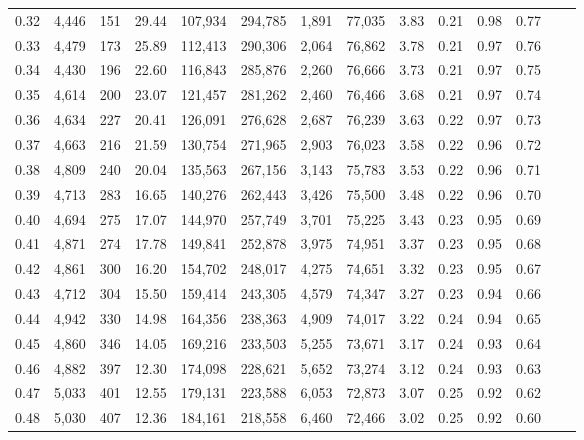 \begin{tabular}{rrrrrrrrrrrrrr}
0.32 &  4,446 &    151 &    29.44 &  107,934 &  294,785 &   1,891 &  77,035 &  3.83 &  0.21 &  0.98 &      0.77 \\
0.33 &  4,479 &    173 &    25.89 &  112,413 &  290,306 &   2,064 &  76,862 &  3.78 &  0.21 &  0.97 &      0.76 \\
0.34 &  4,430 &    196 &    22.60 &  116,843 &  285,876 &   2,260 &  76,666 &  3.73 &  0.21 &  0.97 &      0.75 \\
0.35 &  4,614 &    200 &    23.07 &  121,457 &  281,262 &   2,460 &  76,466 &  3.68 &  0.21 &  0.97 &      0.74 \\
0.36 &  4,634 &    227 &    20.41 &  126,091 &  276,628 &   2,687 &  76,239 &  3.63 &  0.22 &  0.97 &      0.73 \\
0.37 &  4,663 &    216 &    21.59 &  130,754 &  271,965 &   2,903 &  76,023 &  3.58 &  0.22 &  0.96 &      0.72 \\
0.38 &  4,809 &    240 &    20.04 &  135,563 &  267,156 &   3,143 &  75,783 &  3.53 &  0.22 &  0.96 &      0.71 \\
0.39 &  4,713 &    283 &    16.65 &  140,276 &  262,443 &   3,426 &  75,500 &  3.48 &  0.22 &  0.96 &      0.70 \\
0.40 &  4,694 &    275 &    17.07 &  144,970 &  257,749 &   3,701 &  75,225 &  3.43 &  0.23 &  0.95 &      0.69 \\
0.41 &  4,871 &    274 &    17.78 &  149,841 &  252,878 &   3,975 &  74,951 &  3.37 &  0.23 &  0.95 &      0.68 \\
0.42 &  4,861 &    300 &    16.20 &  154,702 &  248,017 &   4,275 &  74,651 &  3.32 &  0.23 &  0.95 &      0.67 \\
0.43 &  4,712 &    304 &    15.50 &  159,414 &  243,305 &   4,579 &  74,347 &  3.27 &  0.23 &  0.94 &      0.66 \\
0.44 &  4,942 &    330 &    14.98 &  164,356 &  238,363 &   4,909 &  74,017 &  3.22 &  0.24 &  0.94 &      0.65 \\
0.45 &  4,860 &    346 &    14.05 &  169,216 &  233,503 &   5,255 &  73,671 &  3.17 &  0.24 &  0.93 &      0.64 \\
0.46 &  4,882 &    397 &    12.30 &  174,098 &  228,621 &   5,652 &  73,274 &  3.12 &  0.24 &  0.93 &      0.63 \\
0.47 &  5,033 &    401 &    12.55 &  179,131 &  223,588 &   6,053 &  72,873 &  3.07 &  0.25 &  0.92 &      0.62 \\
0.48 &  5,030 &    407 &    12.36 &  184,161 &  218,558 &   6,460 &  72,466 &  3.02 &  0.25 &  0.92 &      0.60 \\

\end{tabular}
